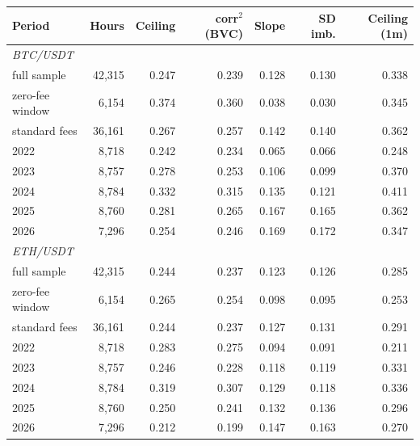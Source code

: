 \begin{tabular}{lrrrrrr}
\toprule
Period & Hours & Ceiling & corr$^2$(BVC) & Slope & SD imb. & Ceiling (1m)\\
\midrule
\multicolumn{7}{l}{\emph{BTC/USDT}}\\
full sample & 42,315 & 0.247 & 0.239 & 0.128 & 0.130 & 0.338\\
zero-fee window & 6,154 & 0.374 & 0.360 & 0.038 & 0.030 & 0.345\\
standard fees & 36,161 & 0.267 & 0.257 & 0.142 & 0.140 & 0.362\\
2022 & 8,718 & 0.242 & 0.234 & 0.065 & 0.066 & 0.248\\
2023 & 8,757 & 0.278 & 0.253 & 0.106 & 0.099 & 0.370\\
2024 & 8,784 & 0.332 & 0.315 & 0.135 & 0.121 & 0.411\\
2025 & 8,760 & 0.281 & 0.265 & 0.167 & 0.165 & 0.362\\
2026 & 7,296 & 0.254 & 0.246 & 0.169 & 0.172 & 0.347\\
\multicolumn{7}{l}{\emph{ETH/USDT}}\\
full sample & 42,315 & 0.244 & 0.237 & 0.123 & 0.126 & 0.285\\
zero-fee window & 6,154 & 0.265 & 0.254 & 0.098 & 0.095 & 0.253\\
standard fees & 36,161 & 0.244 & 0.237 & 0.127 & 0.131 & 0.291\\
2022 & 8,718 & 0.283 & 0.275 & 0.094 & 0.091 & 0.211\\
2023 & 8,757 & 0.246 & 0.228 & 0.118 & 0.119 & 0.331\\
2024 & 8,784 & 0.319 & 0.307 & 0.129 & 0.118 & 0.336\\
2025 & 8,760 & 0.250 & 0.241 & 0.132 & 0.136 & 0.296\\
2026 & 7,296 & 0.212 & 0.199 & 0.147 & 0.163 & 0.270\\
\bottomrule
\end{tabular}
